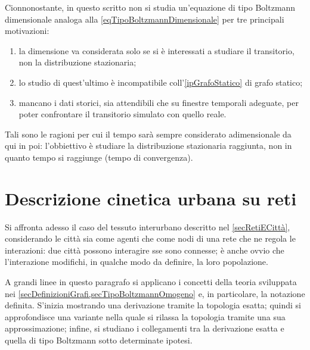         Cionnonostante, in questo scritto non si studia un'equazione di tipo Boltzmann dimensionale analoga alla \cref{eqTipoBoltzmannDimensionale} per tre principali motivazioni:

        \begin{enumerate}[
          label=\arabic*.,
          itemsep=0.1em,
        ]
          \item la dimensione va considerata solo se si è interessati a studiare il transitorio, non la distribuzione stazionaria;
          \item lo studio di quest'ultimo è incompatibile coll'\cref{ipGrafoStatico} di grafo statico; 
          \item mancano i dati storici, sia attendibili che su finestre temporali adeguate, per poter confrontare il transitorio simulato con quello reale.
        \end{enumerate}

        Tali sono le ragioni per cui il tempo sarà sempre considerato adimensionale da qui in poi: l'obbiettivo è studiare la distribuzione stazionaria raggiunta, non in quanto tempo si raggiunge (tempo di convergenza).

  \section{Descrizione cinetica urbana su reti}\label{secDescrizioneCineticaUrbana} %
  
    Si affronta adesso il caso del tessuto interurbano descritto nel \cref{secRetiECittà}, considerando le città sia come agenti che come nodi di una rete che ne regola le interazioni: due città possono interagire sse sono connesse; è anche ovvio che l'interazione modifichi, in qualche modo da definire, la loro popolazione.

    A grandi linee in questo paragrafo si applicano i concetti della teoria sviluppata nei \cref{secDefinizioniGrafi,secTipoBoltzmannOmogeno} e, in particolare, la notazione definita. S'inizia mostrando una derivazione tramite la topologia esatta; quindi si approfondisce una variante nella quale si rilassa la topologia tramite una sua approssimazione; infine, si studiano i collegamenti tra la derivazione esatta e quella di tipo Boltzmann sotto determinate ipotesi.

